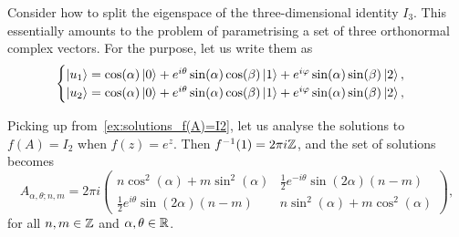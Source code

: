 \begin{example}[label={ex:solutions_f(A)=I_3}]

Consider how to split the eigenspace of the three-dimensional identity $I_3$.
This essentially amounts to the problem of parametrising a set of three orthonormal complex vectors. For the purpose, let us write them as
\begin{equation}
\begin{cases}
    \ket{u_1} = \cos(\alpha)\ket0
    + e^{i\theta}\sin(\alpha)\cos(\beta)\ket1
    + e^{i\varphi}\sin(\alpha)\sin(\beta)\ket2, \\
    \ket{u_2} = \cos(\alpha)\ket0
    + e^{i\theta}\sin(\alpha)\cos(\beta)\ket1
    + e^{i\varphi}\sin(\alpha)\sin(\beta)\ket2, \\
\end{cases}
\end{equation}
\end{example}

\begin{example}[label={ex:solutions_e^A=I2}]
Picking up from~\cref{ex:solutions_f(A)=I2}, let us analyse the solutions to $f(A)=I_2$ when $f(z)=e^z$.
Then $f^{-1}(1)=2\pi i\mathbb{Z}$, and the set of solutions becomes
\begin{equation}
    A_{\alpha,\theta;n,m} = 2\pi i
    \begin{pmatrix}
        n \cos^2(\alpha)+m\sin^2(\alpha) &
        \frac12 e^{-i\theta} \sin(2\alpha) (n-m) \\ 
        \frac12 e^{i\theta} \sin(2\alpha) (n-m) &
        n \sin^2(\alpha)+m\cos^2(\alpha)
    \end{pmatrix},
\end{equation}
for all $n,m\in\mathbb{Z}$ and $\alpha,\theta\in\mathbb{R}$.
\end{example}

